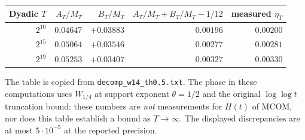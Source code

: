 \documentclass[11pt,a4paper]{article}
\numberwithin{equation}{section}
\theoremstyle{definition}
\theoremstyle{remark}
\begin{document}
\begin{center}\small
\begin{tabular}{@{}rrrrr@{}}
\toprule
Dyadic $T$ & $A_T/M_T$ & $B_T/M_T$ & $A_T/M_T+B_T/M_T-1/12$
& measured $\eta_T$ \\
\midrule
$2^{10}$ & $0.04647$ & $+0.03883$ & $0.00196$ & $0.00200$\\
$2^{15}$ & $0.05064$ & $+0.03546$ & $0.00277$ & $0.00281$\\
$2^{19}$ & $0.05253$ & $+0.03407$ & $0.00327$ & $0.00330$\\
\bottomrule
\end{tabular}
\end{center}
The table is copied from \texttt{decomp\_w14\_th0.5.txt}. The phase
in these computations uses $W_{1/4}$ at support exponent $\theta=1/2$
and the original $\log\log t$ truncation bound: these numbers are
\emph{not} measurements for $H(t)$ of MCOM, nor does this table
establish a bound as $T\to\infty$. The displayed discrepancies are
at most $5\cdot10^{-5}$ at the reported precision.
\end{document}
